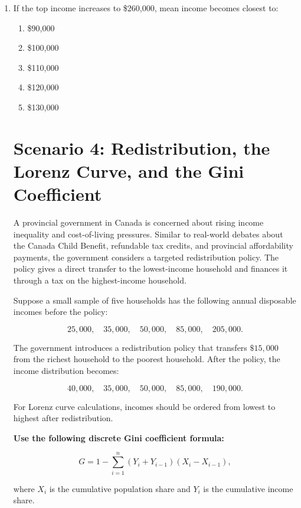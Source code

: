 \documentclass[12pt]{article}
\begin{document}
\begin{enumerate}[label=\textbf{\arabic*.}]
\item If the top income increases to \$260,000, mean income becomes closest to:
\begin{enumerate}[label=\Alph*.]
\item \$90,000
\item \$100,000
\item \$110,000
\item \$120,000
\item \$130,000
\end{enumerate}

\section*{Scenario 4: Redistribution, the Lorenz Curve, and the Gini Coefficient}

A provincial government in Canada is concerned about rising income inequality and cost-of-living pressures. Similar to real-world debates about the Canada Child Benefit, refundable tax credits, and provincial affordability payments, the government considers a targeted redistribution policy. The policy gives a direct transfer to the lowest-income household and finances it through a tax on the highest-income household.

Suppose a small sample of five households has the following annual disposable incomes before the policy:

\[
25{,}000,\quad 35{,}000,\quad 50{,}000,\quad 85{,}000,\quad 205{,}000.
\]

The government introduces a redistribution policy that transfers \(\$15{,}000\) from the richest household to the poorest household. After the policy, the income distribution becomes:

\[
40{,}000,\quad 35{,}000,\quad 50{,}000,\quad 85{,}000,\quad 190{,}000.
\]

For Lorenz curve calculations, incomes should be ordered from lowest to highest after redistribution.

\bigskip

\textbf{Use the following discrete Gini coefficient formula:}

\[
G = 1 - \sum_{i=1}^{n}(Y_i + Y_{i-1})(X_i - X_{i-1}),
\]

where \(X_i\) is the cumulative population share and \(Y_i\) is the cumulative income share.





\end{enumerate}
\end{document}
